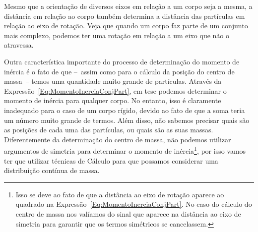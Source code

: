 \begin{marginfigure}
\centering
{}
\caption{Mesmo que a orientação de diversos eixos em relação a um corpo seja a mesma, a distância em relação ao corpo também determina a distância das partículas em relação ao eixo de rotação. Veja que quando um corpo faz parte de um conjunto mais complexo, podemos ter uma rotação em relação a um eixo que não o atravessa. \label{Fig:MomInerciaRotEixosParalelos}}
\end{marginfigure}

Outra característica importante do processo de determinação do momento de inércia é o fato de que --~assim como para o cálculo da posição do centro de massa~-- temos uma quantidade muito grande de partículas. Através da Expressão~\ref{Eq:MomentoInerciaConjPart}, em tese podemos determinar o momento de inércia para qualquer corpo. No entanto, isso é claramente inadequado para o caso de um corpo rígido, devido ao fato de que a soma teria um número muito grande de termos. Além disso, não sabemos precisar quais são as posições de cada uma das partículas, ou quais são as suas massas. Diferentemente da determinação do centro de massa, não podemos utilizar argumentos de simetria para determinar o momento de inércia\footnote{Isso se deve ao fato de que a distância ao eixo de rotação aparece ao quadrado na Expressão~\ref{Eq:MomentoInerciaConjPart}. No caso do cálculo do centro de massa nos valíamos do sinal que aparece na distância ao eixo de simetria para garantir que os termos simétricos se cancelassem.}, por isso vamos ter que utilizar técnicas de Cálculo para que possamos considerar uma distribuição contínua de massa.

